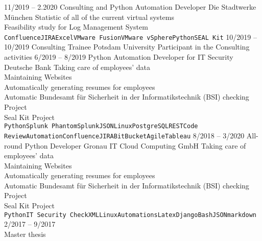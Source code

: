 \documentclass[9pt]{developercv} %
\begin{document}


\begin{entrylist}
	\entry
		{11/2019 -- 2.2020}
		{Consulting and Python Automation Developer}
		{Die Stadtwerke M{\"u}nchen}
		{Statistic of all of the current virtual systems\\Feasibility study for Log Management System\\ \texttt{Confluence}\slashsep\texttt{JIRA}\slashsep\texttt{Excel}\slashsep\texttt{VMware Fusion}\slashsep\texttt{VMware vSphere}\slashsep\texttt{Python}\slashsep\texttt{SEAL Kit}}
	\entry
		{10/2019 -- 10/2019}
		{Consulting Trainee}
		{Potsdam University}
		{Participant in the Consulting activities}
	\entry
		{6/2019 -- 8/2019}
		{Python Automation Developer for IT Security}
		{Deutsche Bank}
		{Taking care of employees' data\\ Maintaining Websites\\Automatically generating resumes for employees\\Automatic Bundesamt f{\"u}r Sicherheit in der Informatikstechnik (BSI) checking Project\\ Seal Kit Project\\ \texttt{Python}\slashsep\texttt{Splunk Phantom}\slashsep\texttt{Splunk}\slashsep\texttt{JSON}\slashsep\texttt{Linux}\slashsep\texttt{PostgreSQL}\slashsep\texttt{REST}\slashsep\texttt{Code Review}\slashsep\texttt{Automation}\slashsep\texttt{Confluence}\slashsep\texttt{JIRA}\slashsep\texttt{BitBucket}\slashsep\texttt{Agile}\slashsep\texttt{Tableau}}
	\entry
		{8/2018 -- 3/2020}
		{All-round Python Developer}
		{Gronau IT Cloud Computing GmbH}
		{Taking care of employees' data\\ Maintaining Websites\\Automatically generating resumes for employees\\Automatic Bundesamt f{\"u}r Sicherheit in der Informatikstechnik (BSI) checking Project\\ Seal Kit Project\\ \texttt{Python}\slashsep\texttt{IT Security Check}\slashsep\texttt{XML}\slashsep\texttt{Linux}\slashsep\texttt{Automations}\slashsep\texttt{Latex}\slashsep\texttt{Django}\slashsep\texttt{Bash}\slashsep\texttt{JSON}\slashsep\texttt{markdown}}
	\entry
		{2/2017 -- 9/2017\\\footnotesize{Master thesis}}

\end{entrylist}
\end{document}
